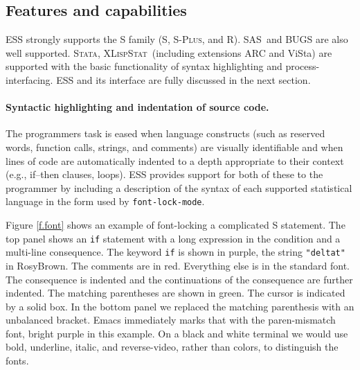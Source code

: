 \documentclass{article}
\newcommand*{\SAS}{\textsc{SAS}}
\newcommand*{\Splus}{\textsc{S-Plus}}
\newcommand*{\XLispStat}{\textsc{XLispStat}}
\newcommand*{\Stata}{\textsc{Stata}}
\newcommand{\stexttt}[1]{{\small\texttt{#1}}}
\begin{document}


\subsection{Features and capabilities}
\label{sec:ESS:features}

ESS strongly supports the S family (S, \Splus, and R).  \SAS\ and BUGS
are also well supported.  \Stata, \XLispStat\ (including extensions
ARC and ViSta) are supported with the basic functionality of syntax
highlighting and process-interfacing.  ESS and its interface are fully
discussed in the next section.

\paragraph{Syntactic highlighting and indentation of source code.}
The programmers task is eased when language constructs (such as
reserved words, function calls, strings, and comments) are visually
identifiable and when lines of code are automatically indented to a
depth appropriate to their context (e.g., if--then clauses, loops).
ESS provides support for both of these to the programmer by
including a description of the syntax of each
supported statistical language in the form used by
\stexttt{font-lock-mode}.  

Figure \ref{f.font} shows an example of font-locking a
complicated S statement.  The top panel shows an \stexttt{if}
statement with a long expression in the condition and a multi-line
consequence.  The keyword \stexttt{if} is shown in purple,
the string \stexttt{"deltat"} in RosyBrown.  The
comments are in red.  Everything else is in the standard
font.  The consequence is indented and the continuations of the
consequence are further indented.  The matching parentheses are shown
in green.  The cursor is indicated
by a solid box.  In the bottom panel we replaced the matching
parenthesis with an unbalanced bracket.  Emacs immediately marks that
with the paren-mismatch font, bright purple in this example.
On a black and white terminal we would use bold, underline, italic,
and reverse-video, rather than colors, to distinguish the fonts.
\end{document}
